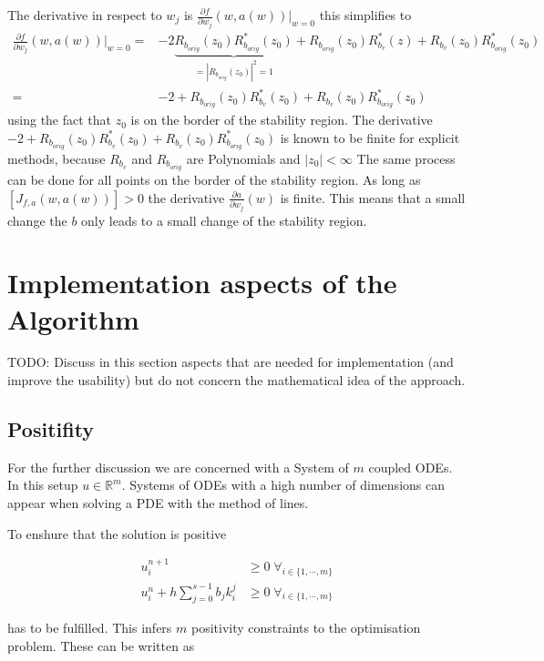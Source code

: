 \documentclass{article}
\begin{document}
The derivative in respect to $w_j$ is 
$ \frac{\partial f}{\partial w_j}(w,a(w)) \Big|_{w=0}$
this simplifies to 
\begin{align*}\label{eq:derivative_to_b}
 \frac{\partial f}{\partial w_j}(w,a(w)) \Big|_{w=0} =&
- 2 \underbrace{R_{b_{orig}}(z_0)R^*_{b_{orig}}(z_0)}_{=|R_{b_{orig}}(z_0)|^2=1} + R_{b_{orig}}(z_0)R^*_{b_v}(z) + R_{b_v}(z_0)R^*_{b_{orig}}(z_0) \\
=& -2 + R_{b_{orig}}(z_0)R^*_{b_v}(z_0) + R_{b_v}(z_0)R^*_{b_{orig}}(z_0)
\end{align*}
using the fact that $z_0$ is on the border of the stability region.
The derivative $-2 + R_{b_{orig}}(z_0)R^*_{b_v}(z_0) + R_{b_v}(z_0)R^*_{b_{orig}}(z_0)$ is known to be finite for explicit methods, because $R_{b_v}$ and $R_{b_{orig}}$ are Polynomials and $|z_0| < \infty$
The same process can be done for all points on the border of the stability region. 
As long as $\left[ J_{f,a}(w,a(w))  \right] > 0$ the derivative $\frac{\partial a}{\partial w_j} (w)$ is finite. This means that a small change the $b$ only leads to a small change of the stability region.



\section{Implementation aspects of the Algorithm}\label{sec:imple}

TODO: Discuss in this section aspects that are needed for implementation (and improve the usability) but do not concern the mathematical idea of the approach.

\subsection{Positifity}


For the further discussion we are concerned with a System of $m$ coupled ODEs. 
In this setup  $u \in \mathbb{R}^m$.
Systems of ODEs with a high number of dimensions can appear when solving a PDE with the method of lines.

To enshure that the solution is positive 

\begin{align}
 u_i^{n+1} &\geq 0   \;   \forall_{i \in \{1, \cdots,m \}}  \\
 u_i^n + h \sum_{j=0}^{s-1} b_j k_i^j  &\geq 0   \;   \forall_{i \in \{1,\cdots,m \}}  
\end{align}

has to be fulfilled.
This infers $m$ positivity constraints to the optimisation problem. These can be written as
\end{document}
